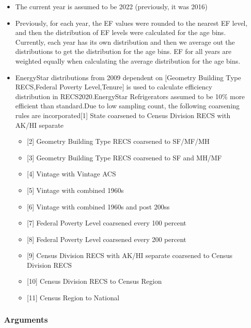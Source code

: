 \begin{itemize}
 
\item
  The current year is assumed to be 2022 (previously, it was 2016)
\item
  Previously, for each year, the EF values were rounded to the nearest
  EF level, and then the distribution of EF levels were calculated for
  the age bins. Currently, each year has its own distribution and then
  we average out the distributions to get the distribution for the age
  bins. EF for all years are weighted equally when calculating the
  average distribution for the age bins.
\item
  EnergyStar distributions from 2009 dependent on {[}Geometry Building
  Type RECS,Federal Poverty Level,Tenure{]} is used to calculate
  efficiency distribution in RECS2020.EnergyStar Refrigerators assumed
  to be 10\% more efficient than standard.Due to low sampling count, the
  following coarsening rules are incorporated{[}1{]} State coarsened to
  Census Division RECS with AK/HI separate

  \begin{itemize}
   
  \item
    {[}2{]} Geometry Building Type RECS coarsened to SF/MF/MH
  \item
    {[}3{]} Geometry Building Type RECS coarsened to SF and MH/MF
  \item
    {[}4{]} Vintage with Vintage ACS
  \item
    {[}5{]} Vintage with combined 1960s
  \item
    {[}6{]} Vintage with combined 1960s and post 200ss
  \item
    {[}7{]} Federal Poverty Level coarsened every 100 percent
  \item
    {[}8{]} Federal Poverty Level coarsened every 200 percent
  \item
    {[}9{]} Census Division RECS with AK/HI separate coarsened to Census
    Division RECS
  \item
    {[}10{]} Census Division RECS to Census Region
  \item
    {[}11{]} Census Region to National
  \end{itemize}
\end{itemize}

\subsubsection{Arguments}\label{arguments-96}

